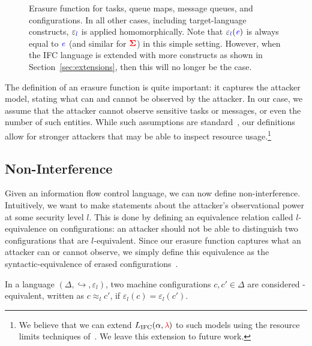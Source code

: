 \documentclass{llncs}
\newcommand{\Varid}[1]{\mathit{#1}}
\newcommand{\Red}[1]{{\color{red} #1}}
\begin{document}
\begin{figure} 
\vspace*{-0.8cm}
\caption{ Erasure function for tasks, queue maps, message queues, and
configurations.  In all other cases, including target-language constructs,
\ensuremath{\varepsilon_{\ifc{l}}} is applied homomorphically.
Note that \ensuremath{\varepsilon_{\ifc{l}}(\ifc{\Varid{e}})} is always equal to \ensuremath{\ifc{\Varid{e}}} (and similar for \ensuremath{\tar{\Sigma}})
in this simple setting.  However,
when the IFC language is extended with more constructs as shown in
Section~\ref{sec:extensions}, then this will no longer be the case.
\label{fig:erasure} }
\end{figure}

The definition of an erasure function is quite important: it captures
the attacker model, stating what can and cannot be observed by the attacker.
In our case, we assume that the attacker cannot observe sensitive tasks or
messages, or even the number of such entities.
While such assumptions are standard~\cite{Castellani:Boudol:ICALP01,
stefan:addressing-covert}, our definitions allow for
stronger attackers that may be able to inspect resource usage.\footnote{
  We believe that we can extend \ensuremath{L_\text{IFC}(\alpha,\Red{\lambda}\;\!\!)} to
  such models using the resource limits techniques of~\cite{yangresource}.
We leave this extension to future work.
}

\subsection{Non-Interference}

Given an information flow control language, we can now define non-interference.
Intuitively, we want to make statements about the attacker's observational
power at some security level \ensuremath{l}.  This is done by defining an equivalence
relation called \ensuremath{l}-equivalence on configurations: an attacker should
not be able to distinguish two configurations that are \ensuremath{l}-equivalent.
Since our erasure function captures what an attacker can or cannot observe, we simply define this
equivalence as the syntactic-equivalence of erased configurations~\cite{stefan:addressing-covert}.
\begin{definition}
    In a language \ensuremath{(\Delta,\hookrightarrow,\varepsilon_{l})}, two machine configurations
    \ensuremath{c,c'\in\Delta} are considered -equivalent, written as \ensuremath{c\approx_lc'},
    if \ensuremath{\varepsilon_{l}(c)\mathrel{=}\varepsilon_{l}(c')}.
\end{definition}
\end{document}
